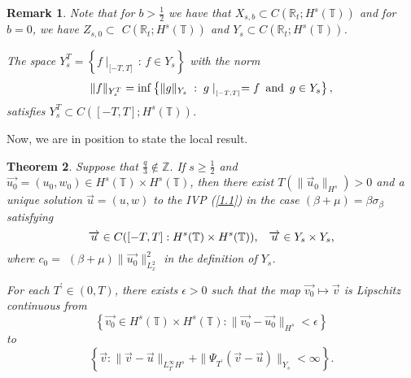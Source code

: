 \documentclass[reqno]{amsart}
\newtheorem{theorem}{Theorem}[section]
\newtheorem{remark}[theorem]{Remark}
\numberwithin{equation}{section}
\begin{document}
\begin{remark}
Note that for $b>\frac{1}{2}$ we have that  $X_{s,b}\subset C(\mathbb{R}_{t};H^{s}(\mathbb{T}))$ and
 for $b=0$, we have $Z_{s,0}\subset$
$C(\mathbb{R}_{t};H^{s}(\mathbb{T}))$ and $Y_{s}\subset C(\mathbb{R}_{t};H^{s}(\mathbb{T}))$.

The space $Y_{s}^{T}=\left\{  f\mid_{\lbrack-T,T]}\,:\,f\in
Y_{s}\right\} $ with the norm
\[
\| f\| _{Y_{s}^{T}}=\inf\left\{  \|g\| _{Y_{s}}\;:\;
g\mid_{_{\lbrack-T,T]}}=f\text{\hskip5pt and\hskip5pt}g\in
Y_{s}\right\},
\]
satisfies $Y_{s}^{T}\subset C([-T,T];H^{s}(\mathbb{T}))$.
\end{remark}

Now, we are in position to state the local result.

\begin{theorem}\label{teo1.7}
Suppose that $\frac{q}{3}\notin\mathbb{Z}$. If $s\geq\frac{1}{2}$
and $\overrightarrow{u_0}=\left(  u_{0},w_{0}\right)  \in H^{s}(\mathbb{T})\times H^{s}(\mathbb{T})$, then there exist $T(\| \overrightarrow{u}_{0}\| _{H^{s}})>0$ and a unique solution
$\overrightarrow{u}=(u,w)$ to the IVP (\ref{1.1}) in the case
$(\beta+\mu)=\beta\sigma_{\beta}$ satisfying
\[
\overrightarrow{u}\in C([-T,T]:H^{s}(\mathbb{T})\times H^{s}(\mathbb{T}))\text{,\quad}\overrightarrow{u}\in Y_{s}\times Y_{s}\text{,}\]
where $c_{0}=$ $(\beta+\mu)\| \overrightarrow{u_0}\|
_{L_{x}^{2}}^{2}$ in the definition of $Y_{s}$.

For each $T^{\prime}\in(0,T)$, there exists $\epsilon>0$ such that
the map $\overrightarrow{{v}_{0}}\mapsto\overrightarrow{v}$ is
Lipschitz continuous from
\[
\left\{  \overrightarrow{{v}_{0}}\in H^{s}(\mathbb{T})\times H^{s}
(\mathbb{T}):\| \overrightarrow{{v}_{0}}-\overrightarrow{{u}
_{0}}\| _{H^{s}}<\epsilon\right\}
\]
to
\[
\left\{  \overrightarrow{v}:\| \overrightarrow{v}-\overrightarrow
{u}\| _{L_{T^{\prime}}^{\infty}H^{s}}+\| \Psi_{T^{\prime}}(\overrightarrow{v}-\overrightarrow{u})\| _{Y_{s}}<\infty\right\}
\text{.}\]

\end{theorem}
\end{document}
